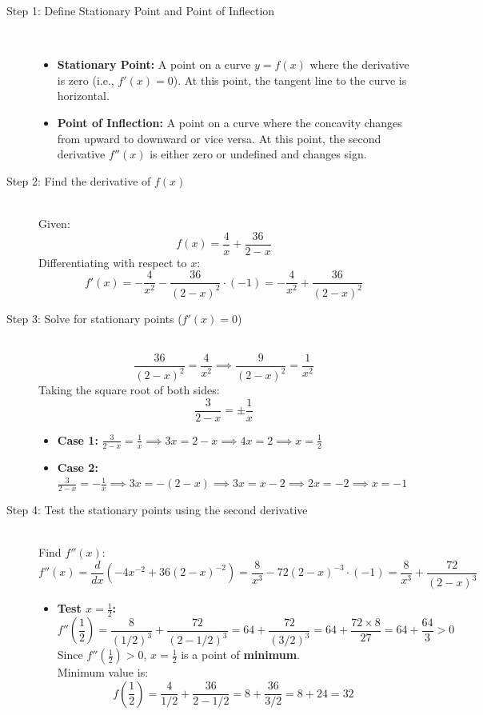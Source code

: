 \documentclass[11pt, a4paper]{article}
\begin{document}
\begin{description}
    \item[Step 1: Define Stationary Point and Point of Inflection] \ 
    \begin{itemize}
        \item \textbf{Stationary Point:} A point on a curve $y = f(x)$ where the derivative is zero (i.e., $f'(x) = 0$). At this point, the tangent line to the curve is horizontal.
        \item \textbf{Point of Inflection:} A point on a curve where the concavity changes from upward to downward or vice versa. At this point, the second derivative $f''(x)$ is either zero or undefined and changes sign.
    \end{itemize}

    \item[Step 2: Find the derivative of $f(x)$] \ \\
    Given:
    \[ f(x) = \frac{4}{x} + \frac{36}{2-x} \]
    Differentiating with respect to $x$:
    \[ f'(x) = -\frac{4}{x^2} - \frac{36}{(2-x)^2} \cdot (-1) = -\frac{4}{x^2} + \frac{36}{(2-x)^2} \]

    \item[Step 3: Solve for stationary points ($f'(x) = 0$)] \ \\
    \[ \frac{36}{(2-x)^2} = \frac{4}{x^2} \implies \frac{9}{(2-x)^2} = \frac{1}{x^2} \]
    Taking the square root of both sides:
    \[ \frac{3}{2-x} = \pm \frac{1}{x} \]
    \begin{itemize}
        \item \textbf{Case 1:} $\frac{3}{2-x} = \frac{1}{x} \implies 3x = 2-x \implies 4x = 2 \implies x = \frac{1}{2}$
        \item \textbf{Case 2:} $\frac{3}{2-x} = -\frac{1}{x} \implies 3x = -(2-x) \implies 3x = x - 2 \implies 2x = -2 \implies x = -1$
    \end{itemize}

    \item[Step 4: Test the stationary points using the second derivative] \ \\
    Find $f''(x)$:
    \[ f''(x) = \frac{d}{dx} \left( -4x^{-2} + 36(2-x)^{-2} \right) = \frac{8}{x^3} - 72(2-x)^{-3} \cdot (-1) = \frac{8}{x^3} + \frac{72}{(2-x)^3} \]
    \begin{itemize}
        \item \textbf{Test $x = \frac{1}{2}$:}
        \[ f''\left(\frac{1}{2}\right) = \frac{8}{(1/2)^3} + \frac{72}{(2-1/2)^3} = 64 + \frac{72}{(3/2)^3} = 64 + \frac{72 \times 8}{27} = 64 + \frac{64}{3} > 0 \]
        Since $f''(\frac{1}{2}) > 0$, $x = \frac{1}{2}$ is a point of \textbf{minimum}.\\
        Minimum value is:
        \[ f\left(\frac{1}{2}\right) = \frac{4}{1/2} + \frac{36}{2 - 1/2} = 8 + \frac{36}{3/2} = 8 + 24 = 32 \]


\end{itemize}
\end{description}
\end{document}
